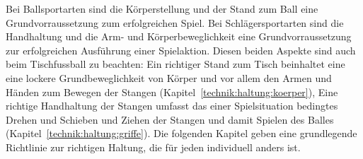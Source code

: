 Bei Ballsportarten sind die Körperstellung und der Stand zum Ball eine Grundvorraussetzung zum erfolgreichen Spiel.
Bei Schlägersportarten sind die Handhaltung und die Arm- und Körperbeweglichkeit eine Grundvorraussetzung zur erfolgreichen Ausführung einer Spielaktion.
Diesen beiden Aspekte sind auch beim Tischfussball zu beachten:
Ein richtiger Stand zum Tisch beinhaltet eine eine lockere Grundbeweglichkeit von Körper und vor allem den Armen und Händen zum Bewegen der Stangen (Kapitel~\ref{technik:haltung:koerper}),
Eine richtige Handhaltung der Stangen umfasst das einer Spielsituation bedingtes Drehen und Schieben und Ziehen der Stangen und damit Spielen des Balles (Kapitel~\ref{technik:haltung:griffe}).
Die folgenden Kapitel geben eine grundlegende Richtlinie zur richtigen Haltung, die für jeden individuell anders ist. 

